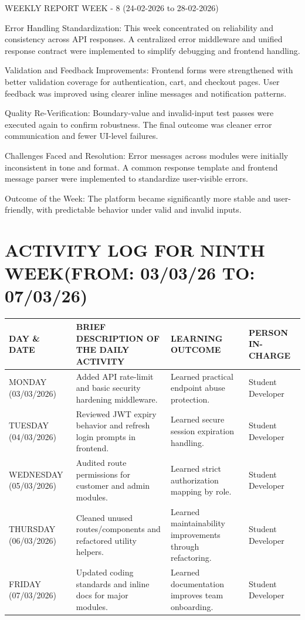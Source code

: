\documentclass[12pt,a4paper]{report}
\begin{document}
WEEKLY REPORT
WEEK - 8 (24-02-2026 to 28-02-2026)

Error Handling Standardization:
This week concentrated on reliability and consistency across API responses. A centralized error middleware and unified response contract were implemented to simplify debugging and frontend handling.

Validation and Feedback Improvements:
Frontend forms were strengthened with better validation coverage for authentication, cart, and checkout pages. User feedback was improved using clearer inline messages and notification patterns.

Quality Re-Verification:
Boundary-value and invalid-input test passes were executed again to confirm robustness. The final outcome was cleaner error communication and fewer UI-level failures.

Challenges Faced and Resolution:
Error messages across modules were initially inconsistent in tone and format. A common response template and frontend message parser were implemented to standardize user-visible errors.

Outcome of the Week:
The platform became significantly more stable and user-friendly, with predictable behavior under valid and invalid inputs.

\section*{ACTIVITY LOG FOR NINTH WEEK(FROM: 03/03/26 TO: 07/03/26)}
\begin{longtable}{|p{2.2cm}|p{5.2cm}|p{4.3cm}|p{3.2cm}|}
\hline
\textbf{DAY \& DATE} & \textbf{BRIEF DESCRIPTION OF THE DAILY ACTIVITY} & \textbf{LEARNING OUTCOME} & \textbf{PERSON IN- CHARGE} \\
\hline
MONDAY (03/03/2026) & Added API rate-limit and basic security hardening middleware. & Learned practical endpoint abuse protection. & Student Developer \\
\hline
TUESDAY (04/03/2026) & Reviewed JWT expiry behavior and refresh login prompts in frontend. & Learned secure session expiration handling. & Student Developer \\
\hline
WEDNESDAY (05/03/2026) & Audited route permissions for customer and admin modules. & Learned strict authorization mapping by role. & Student Developer \\
\hline
THURSDAY (06/03/2026) & Cleaned unused routes/components and refactored utility helpers. & Learned maintainability improvements through refactoring. & Student Developer \\
\hline
FRIDAY (07/03/2026) & Updated coding standards and inline docs for major modules. & Learned documentation improves team onboarding. & Student Developer \\
\hline
\end{longtable}
\end{document}
